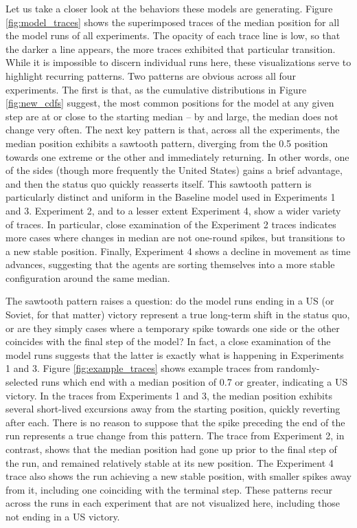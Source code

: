 Let us take a closer look at the behaviors these models are generating. Figure \ref{fig:model_traces} shows the superimposed traces of the median position for all the model runs of all experiments. The opacity of each trace line is low, so that the darker a line appears, the more traces exhibited that particular transition. While it is impossible to discern individual runs here, these visualizations serve to highlight recurring patterns. Two patterns are obvious across all four experiments. The first is that, as the cumulative distributions in Figure \ref{fig:new_cdfs} suggest, the most common positions for the model at any given step are at or close to the starting median -- by and large, the median does not change very often. The next key pattern is that, across all the experiments, the median position exhibits a sawtooth pattern, diverging from the 0.5 position towards one extreme or the other and immediately returning. In other words, one of the sides (though more frequently the United States) gains a brief advantage, and then the status quo quickly reasserts itself. This sawtooth pattern is particularly distinct and uniform in the Baseline model used in Experiments 1 and 3. Experiment 2, and to a lesser extent Experiment 4, show a wider variety of traces. In particular, close examination of the Experiment 2 traces indicates more cases where changes in median are not one-round spikes, but transitions to a new stable position. Finally, Experiment 4 shows a decline in movement as time advances, suggesting that the agents are sorting themselves into a more stable configuration around the same median.

The sawtooth pattern raises a question: do the model runs ending in a US (or Soviet, for that matter) victory represent a true long-term shift in the status quo, or are they simply cases where a temporary spike towards one side or the other coincides with the final step of the model? In fact, a close examination of the model runs suggests that the latter is exactly what is happening in Experiments 1 and 3. Figure \ref{fig:example_traces} shows example traces from randomly-selected runs which end with a median position of 0.7 or greater, indicating a US victory. In the traces from Experiments 1 and 3, the median position exhibits several short-lived excursions away from the starting position, quickly reverting after each. There is no reason to suppose that the spike preceding the end of the run represents a true change from this pattern. The trace from Experiment 2, in contrast, shows that the median position had gone up prior to the final step of the run, and remained relatively stable at its new position. The Experiment 4 trace also shows the run achieving a new stable position, with smaller spikes away from it, including one coinciding with the terminal step. These patterns recur across the runs in each experiment that are not visualized here, including those not ending in a US victory.

